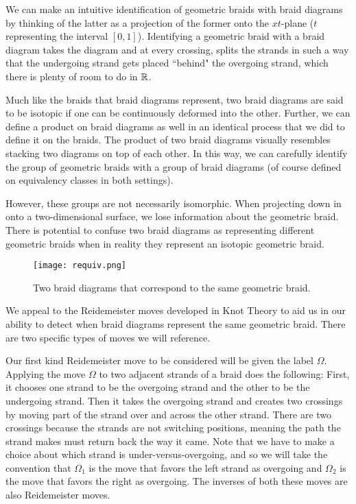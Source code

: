 We can make an intuitive identification of geometric braids with braid diagrams by thinking of the latter as a projection of the former onto the $xt$-plane ($t$ representing the interval $[0,1]$). Identifying a geometric braid with a braid diagram takes the diagram and at every crossing, splits the strands in such a way that the undergoing strand gets placed ``behind" the overgoing strand, which there is plenty of room to do in $\mathbb{R}$.

Much like the braids that braid diagrams represent, two braid diagrams are said to be isotopic if one can be continuously deformed into the other. Further, we can define a product on braid diagrams as well in an identical process that we did to define it on the braids. The product of two braid diagrams visually resembles stacking two diagrams on top of each other. In this way, we can carefully identify the group of geometric braids with a group of braid diagrams (of course defined on equivalency classes in both settings). 

However, these groups are not necessarily isomorphic. When projecting down in onto a two-dimensional surface, we lose information about the geometric braid. There is potential to confuse two braid diagrams as representing different geometric braids when in reality they represent an isotopic geometric braid.

\begin{figure}[H]
	\centering
	\texttt{[image: requiv.png]}
	\caption{Two braid diagrams that correspond to the same geometric braid.}
\end{figure}

We appeal to the Reidemeister moves developed in Knot Theory to aid us in our ability to detect when braid diagrams represent the same geometric braid. There are two specific types of moves we will reference.

Our first kind Reidemeister move to be considered will be given the label $\Omega$. Applying the move $\Omega$ to two adjacent strands of a braid does the following: First, it chooses one strand to be the overgoing strand and the other to be the undergoing strand. Then it takes the overgoing strand and creates two crossings by moving part of the strand over and across the other strand. There are two crossings because the strands are not switching positions, meaning the path the strand makes must return back the way it came. Note that we have to make a choice about which strand is under-versus-overgoing, and so we will take the convention that $\Omega_1$ is the move that favors the left strand as overgoing and $\Omega_2$ is the move that favors the right as overgoing. The inverses of both these moves are also Reidemeister moves.

